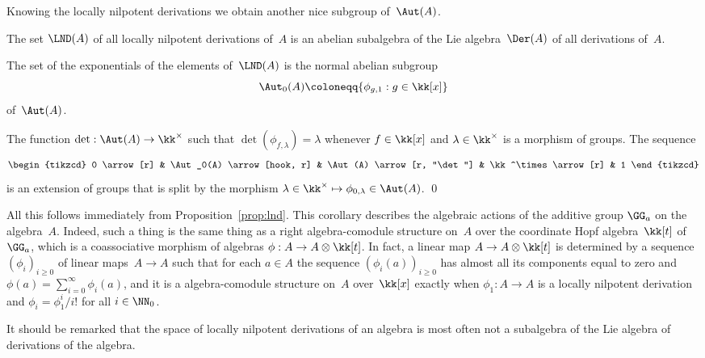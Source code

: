 Knowing the locally nilpotent derivations we obtain another nice subgroup
of~$\Aut(A)$.

\begin{Corollary}\mbox{}\label{coro:aut-0}
\begin{thmlist}

\item The set $\LND(A)$ of all locally nilpotent derivations of~$A$ is an
abelian subalgebra of the Lie algebra~$\Der(A)$ of all derivations of~$A$.

\item The set of the exponentials of the elements of~$\LND(A)$ is the
normal abelian subgroup 
  \[
  \Aut_0(A) \coloneqq \{\phi_{g,1}:g\in\kk[x]\}
  \]
of~$\Aut(A)$. 

\item The function $\det:\Aut(A)\to\kk^\times$ such that
$\det(\phi_{f,\lambda})=\lambda$ whenever $f\in\kk[x]$ and
$\lambda\in\kk^\times$ is a morphism of groups. The sequence
  \[
  \begin{tikzcd}
  0 \arrow[r]
    & \Aut_0(A) \arrow[hook, r]
    & \Aut(A) \arrow[r, "\det"]
    & \kk^\times \arrow[r]
    & 1
  \end{tikzcd}
  \]
is an extension of groups that is split by the morphism
$\lambda\in\kk^\times\mapsto\phi_{0,\lambda}\in\Aut(A)$. \qed

\end{thmlist}
\end{Corollary}

All this follows immediately from Proposition~\ref{prop:lnd}. This
corollary describes the algebraic actions of the additive group $\GG_a$ on
the algebra~$A$. Indeed, such a thing is the same thing as a right
algebra-comodule structure on~$A$ over the coordinate Hopf algebra~$\kk[t]$
of~$\GG_a$, which is a coassociative morphism of algebras $\phi:A\to
A\otimes\kk[t]$. In fact, a linear map $A\to A\otimes\kk[t]$ is determined
by a sequence $(\phi_i)_{i\geq0}$ of linear maps~$A\to A$ such that for
each $a\in A$ the sequence $(\phi_i(a))_{i\geq0}$ has almost all its
components equal to zero and $\phi(a)=\sum_{i=0}^\infty\phi_i(a)$, and it
is a algebra-comodule structure on~$A$ over~$\kk[x]$ exactly when
$\phi_1:A\to A$ is a locally nilpotent derivation and $\phi_i=\phi_1^i/i!$
for all $i\in\NN_0$.

It should be remarked that the space of locally nilpotent derivations of an
algebra is most often not a subalgebra of the Lie algebra of
derivations of the algebra.

